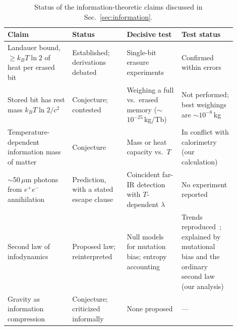 \begin{table}[t]
\centering
\small
\caption{Status of the information-theoretic claims discussed in
Sec.~\ref{sec:information}.}
\label{tab:information}
\begin{tabular}{p{0.26\linewidth}p{0.2\linewidth}p{0.22\linewidth}p{0.22\linewidth}}
\hline
Claim & Status & Decisive test & Test status \\
\hline
Landauer bound, $\ge k_BT\ln2$ of heat per erased bit~\cite{Landauer1961irreversibility} &
Established; derivations debated~\cite{Norton2011waiting} &
Single-bit erasure experiments &
Confirmed within errors~\cite{Berut2012experimental,Jun2014high,Hong2016experimental} \\
Stored bit has rest mass $k_BT\ln2/c^2$~\cite{Vopson2019mass} &
Conjecture; contested~\cite{Lairez2024on,Burgin2022is} &
Weighing a full vs.\ erased memory ($\sim$$10^{-25}$\,kg/Tb) &
Not performed; best weighings are ${\sim}10^{-8}$\,kg~\cite{Kish2013does} \\
Temperature-dependent information mass of matter~\cite{Vopson2022experimental} &
Conjecture &
Mass or heat capacity vs.\ $T$ &
In conflict with calorimetry (our calculation) \\
$\sim$50\,$\mu$m photons from $e^+e^-$ annihilation~\cite{Vopson2022experimental} &
Prediction, with a stated escape clause &
Coincident far-IR detection with $T$-dependent $\lambda$ &
No experiment reported \\
Second law of infodynamics~\cite{Vopson2022second} &
Proposed law; reinterpreted~\cite{Crecraft2024second,Todd2026thermodynamic} &
Null models for mutation bias; entropy accounting &
Trends reproduced~\cite{Ostrowski2024entropy}; explained by mutational bias and the ordinary second law (our analysis) \\
Gravity as information compression~\cite{Vopson2025is} &
Conjecture; criticized informally~\cite{Hossenfelder2025gravity} &
None proposed &
--- \\
\hline
\end{tabular}
\end{table}
